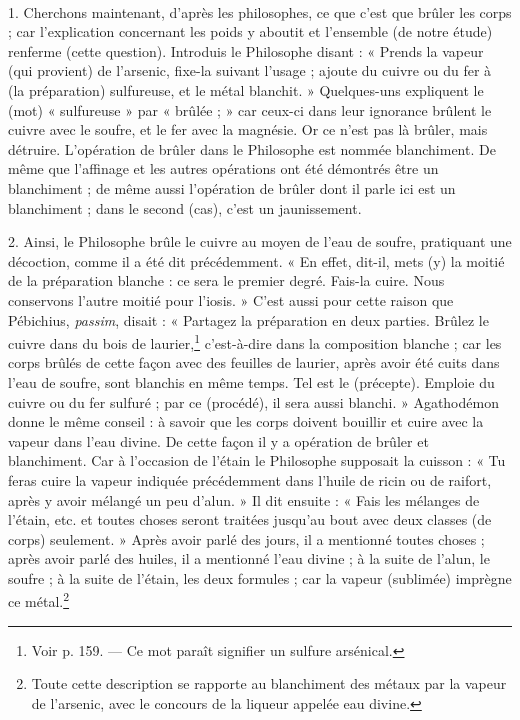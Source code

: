 \documentclass[a4paper, 11pt, oneside, polutonikogreek, french]{article}
\begin{document}
\paragraph{}
1. Cherchons maintenant, d'après les philosophes, ce que c'est que brûler les corps ; car l'explication concernant les poids y aboutit et l'ensemble (de notre étude) renferme (cette question). Introduis le Philosophe disant : « Prends la vapeur (qui provient) de l'arsenic, fixe-la suivant l'usage ; ajoute du cuivre ou du fer à (la préparation) sulfureuse, et le métal blanchit. » Quelques-uns expliquent le (mot) « sulfureuse » par « brûlée ; » car ceux-ci dans leur ignorance brûlent le cuivre avec le soufre, et le fer avec la magnésie. Or ce n'est pas là brûler, mais détruire. L'opération de brûler dans le Philosophe est nommée blanchiment. De même que l'affinage et les autres opérations ont été démontrés être un blanchiment ; de même aussi l'opération de brûler dont il parle ici est un blanchiment ; dans le second (cas), c'est un jaunissement.

2. Ainsi, le Philosophe brûle le cuivre au moyen de l'eau de soufre, pratiquant une décoction, comme il a été dit précédemment. « En effet, dit-il, mets (y) la moitié de la préparation blanche : ce sera le premier degré. Fais-la cuire. Nous conservons l'autre moitié pour l'iosis. » C'est aussi pour cette raison que Pébichius, \emph{passim}, disait : « Partagez la préparation en deux parties. Brûlez le cuivre dans du bois de laurier,\footnote{Voir p. 159. --- Ce mot paraît signifier un sulfure arsénical.} c'est-à-dire dans la composition blanche ; car les corps brûlés de cette façon avec des feuilles de laurier, après avoir été cuits dans l'eau de soufre, sont blanchis en même temps. Tel est le (précepte). Emploie du cuivre ou du fer sulfuré ; par ce (procédé), il sera aussi blanchi. » Agathodémon donne le même conseil : à savoir que les corps doivent bouillir et cuire avec la vapeur dans l'eau divine. De cette façon il y a opération de brûler et blanchiment. Car à l'occasion de l'étain le Philosophe supposait la cuisson : « Tu feras cuire la vapeur indiquée précédemment dans l'huile de ricin ou de raifort, après y avoir mélangé un peu d'alun. » Il dit ensuite : « Fais les mélanges de l'étain, etc. et toutes choses seront traitées jusqu'au bout avec deux classes (de corps) seulement. » Après avoir parlé des jours, il a mentionné toutes choses ; après avoir parlé des huiles, il a mentionné l'eau divine ; à la suite de l'alun, le soufre ; à la suite de l'étain, les deux formules ; car la vapeur (sublimée) imprègne ce métal.\footnote{Toute cette description se rapporte au blanchiment des métaux par la vapeur de l'arsenic, avec le concours de la liqueur appelée eau divine.}
\end{document}
